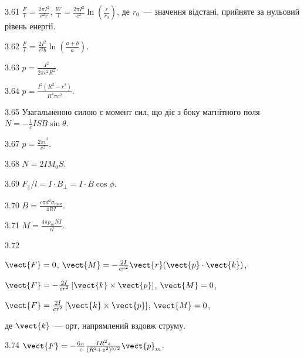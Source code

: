 \begin{Solution}{3.{61}}
	$\frac{F}{l} = \frac{2\pi I^2}{c^2r}$,
	$\frac{W}{l} = \frac{2\pi I^2}{c^2}\ln \left( \frac{r}{r_0}\right) $, де $r_0$~--- значення відстані, прийняте за нульовий рівень енергії.
\end{Solution}
\begin{Solution}{3.{62}}
	$\frac{F}{l} = \frac{2I^2}{c^2b}\ln\left( \frac{a + b}{a}\right) $.
\end{Solution}
\begin{Solution}{3.{63}}
	$p = \frac{I^2}{2\pi c^2R^2}$.
\end{Solution}
\begin{Solution}{3.{64}}
	$p = \frac{I^2(R^2 - r^2)}{R^4\pi c^2}$.
\end{Solution}
\begin{Solution}{3.{65}}
	Узагальненою силою є момент сил, що діє з боку магнітного поля $N = -\frac1c ISB\sin\theta$.
\end{Solution}
\begin{Solution}{3.{67}}
	$p = \frac{2\pi i^2}{c^2}$.
\end{Solution}
\begin{Solution}{3.{68}}
	$N  = 2I  M_0 S$.
\end{Solution}
\begin{Solution}{3.{69}}
	$F_\parallel/l  = I\cdot  B_\bot = I\cdot B\cos\phi$.
\end{Solution}
\begin{Solution}{3.{70}}
	$B = \frac{c\pi d^2 \sigma_{\max}}{4RI}$.
\end{Solution}
\begin{Solution}{3.{71}}
	$M = \frac{4\pi p_m NI}{cl}$.
\end{Solution}
\begin{Solution}{3.{72}}
	\begin{enumerate*}[label=\alph*)]
		\item $\vect{F} = 0$, $\vect{M} = - \frac{2I}{cr^2} \vect{r} (\vect{p} \cdot \vect{k})$,
		\item $\vect{F} = - \frac{2I}{cr^2} \left[ \vect{k} \times \vect{p}\right]$, $\vect{M} = 0$,
		\item $\vect{F} = \frac{2I}{cr^2} \left[ \vect{k} \times \vect{p}\right]$, $\vect{M} = 0$,
	\end{enumerate*}
	де $\vect{k}$~--- орт, напрямлений вздовж струму.
\end{Solution}
\begin{Solution}{3.{74}}
	$\vect{F} = -\frac{6\pi}{c}\frac{IR^2z}{(R^2 + z^2)^{5/2}}\vect{p}_m$.
\end{Solution}
